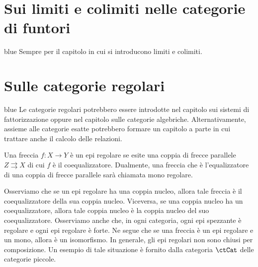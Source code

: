\section{Sui limiti e colimiti nelle categorie di funtori}\label{sec_lim_cat_fun}

\begin{color}{blue}
 Sempre per il capitolo in cui si introducono limiti e colimiti.
\end{color}

\hfill

\noindent



\section{Sulle categorie regolari}\label{sec_cat_regolari}

\begin{color}{blue}
 Le categorie regolari potrebbero essere introdotte nel capitolo sui sistemi di fattorizzazione oppure nel capitolo sulle
 categorie algebriche. Alternativamente, assieme alle categorie esatte potrebbero formare un capitolo a parte in cui
 trattare anche il calcolo delle relazioni.
\end{color}

\begin{definition}\label{def_epi_reg}
 Una freccia \(f \colon X \to Y\) è un epi regolare se esite una coppia di frecce parallele \(Z \rightrightarrows X\) di cui
 \(f\) è il coequalizzatore. Dualmente, una freccia che è l'equalizzatore di una coppia di frecce parallele sarà chiamata
 mono regolare.
\end{definition}

\begin{remark}\label{oss_epi_reg}
 Osserviamo che se un epi regolare ha una coppia nucleo, allora tale freccia è il coequalizzatore della sua coppia nucleo.
 Viceversa, se una coppia nucleo ha un coequalizzatore, allora tale coppia nucleo è la coppia nucleo del suo coequalizzatore.
 Osserviamo anche che, in ogni categoria, ogni epi spezzante è regolare e ogni epi regolare è forte.
 Ne segue che se una freccia è un epi regolare e un mono, allora è un isomorfismo.
 In generale, gli epi regolari non sono chiusi per composizione. Un esempio di tale situazione è fornito dalla categoria
 \(\ctCat\) delle categorie piccole.
\end{remark}

